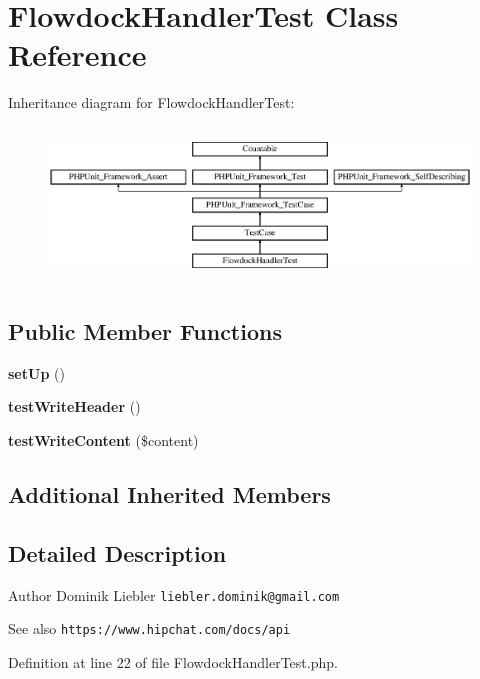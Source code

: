 \section{Flowdock\+Handler\+Test Class Reference}
\label{class_monolog_1_1_handler_1_1_flowdock_handler_test}
Inheritance diagram for Flowdock\+Handler\+Test\+:\begin{figure}[H]
\begin{center}
\leavevmode
\includegraphics[height=4.129793cm]{class_monolog_1_1_handler_1_1_flowdock_handler_test}
\end{center}
\end{figure}
\subsection*{Public Member Functions}
\begin{DoxyCompactItemize}
\item 
{\bf set\+Up} ()
\item 
{\bf test\+Write\+Header} ()
\item 
{\bf test\+Write\+Content} (\$content)
\end{DoxyCompactItemize}
\subsection*{Additional Inherited Members}


\subsection{Detailed Description}
\begin{DoxyAuthor}{Author}
Dominik Liebler {\tt liebler.\+dominik@gmail.\+com} 
\end{DoxyAuthor}
\begin{DoxySeeAlso}{See also}
{\tt https\+://www.\+hipchat.\+com/docs/api} 
\end{DoxySeeAlso}


Definition at line 22 of file Flowdock\+Handler\+Test.\+php.




